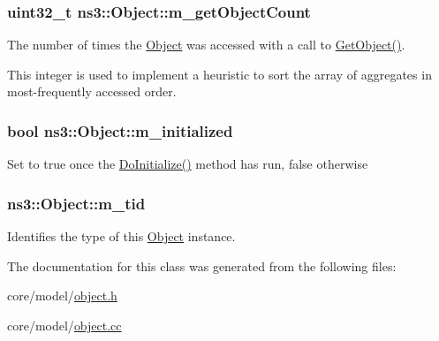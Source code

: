 \subsubsection[{\texorpdfstring{m\+\_\+get\+Object\+Count}{m_getObjectCount}}]{\setlength{\rightskip}{0pt plus 5cm}uint32\+\_\+t ns3\+::\+Object\+::m\+\_\+get\+Object\+Count\hspace{0.3cm}{\ttfamily [private]}}\hypertarget{classns3_1_1Object_af550c6702a9cec5f8bc16bff314d5f28}{}\label{classns3_1_1Object_af550c6702a9cec5f8bc16bff314d5f28}
The number of times the \hyperlink{classns3_1_1Object}{Object} was accessed with a call to \hyperlink{classns3_1_1Object_a13e18c00017096c8381eb651d5bd0783}{Get\+Object()}.

This integer is used to implement a heuristic to sort the array of aggregates in most-\/frequently accessed order. 
\subsubsection[{\texorpdfstring{m\+\_\+initialized}{m_initialized}}]{\setlength{\rightskip}{0pt plus 5cm}bool ns3\+::\+Object\+::m\+\_\+initialized\hspace{0.3cm}{\ttfamily [private]}}\hypertarget{classns3_1_1Object_afdecc4c2dde89891d0f285a535bb5a85}{}\label{classns3_1_1Object_afdecc4c2dde89891d0f285a535bb5a85}
Set to {\ttfamily true} once the \hyperlink{classns3_1_1Object_af8482a521433409fb5c7f749398c9dbe}{Do\+Initialize()} method has run, {\ttfamily false} otherwise 
\subsubsection[{\texorpdfstring{m\+\_\+tid}{m_tid}}]{ ns3\+::\+Object\+::m\+\_\+tid\hspace{0.3cm}{\ttfamily [private]}}\hypertarget{classns3_1_1Object_ab9aaa1e40c7ea082f6f602c4694f2ab8}{}\label{classns3_1_1Object_ab9aaa1e40c7ea082f6f602c4694f2ab8}
Identifies the type of this \hyperlink{classns3_1_1Object}{Object} instance. 

The documentation for this class was generated from the following files\+:\begin{DoxyCompactItemize}
\item 
core/model/\hyperlink{object_8h}{object.\+h}\item 
core/model/\hyperlink{object_8cc}{object.\+cc}\end{DoxyCompactItemize}
